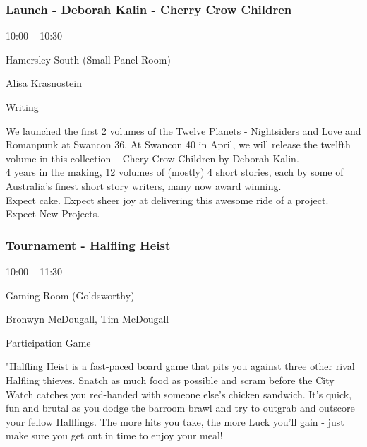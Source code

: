 \documentclass{scrreprt}
\begin{document}
\begin{multicols}{2}
\subsubsection*{Launch - Deborah Kalin - Cherry Crow Children}\begin{description}
\setlength{\itemsep}{0pt}
\setlength{\parsep}{0pt}
\setlength{\parskip}{0pt}
\item[Time:]{10:00 -- 10:30}
\item[Venue:]{Hamersley South (Small Panel Room)}
\item[People:]{Alisa Krasnostein}
\item[Tags:]{Writing}\end{description}
We launched the first 2 volumes of the Twelve Planets - Nightsiders and Love and Romanpunk at Swancon 36. At Swancon 40 in April, we will release the twelfth volume in this collection – Chery Crow Children by Deborah Kalin.\\4 years in the making, 12 volumes of (mostly) 4 short stories, each by some of Australia’s finest short story writers, many now award winning.\\Expect cake. Expect sheer joy at delivering this awesome ride of a project. Expect New Projects.
\subsubsection*{Tournament - Halfling Heist}\begin{description}
\setlength{\itemsep}{0pt}
\setlength{\parsep}{0pt}
\setlength{\parskip}{0pt}
\item[Time:]{10:00 -- 11:30}
\item[Venue:]{Gaming Room (Goldsworthy)}
\item[People:]{Bronwyn McDougall, Tim McDougall}
\item[Tags:]{Participation Game}\end{description}
"Halfling Heist is a fast-paced board game that pits you against three other rival Halfling thieves. Snatch as much food as possible and scram before the City Watch catches you red-handed with someone else’s chicken sandwich. It’s quick, fun and brutal as you dodge the barroom brawl and try to outgrab and outscore your fellow Halflings. The more hits you take, the more Luck you’ll gain - just make sure you get out in time to enjoy your meal!

\end{multicols}
\end{document}
